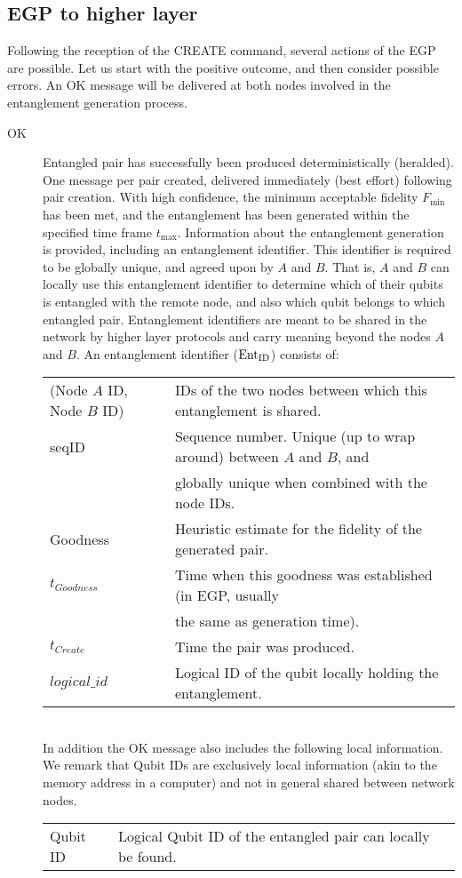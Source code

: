 \documentclass{article}
\newcommand{\entid}{{\rm Ent}_{\rm ID}}
\begin{document}
\subsection{EGP to higher layer}
Following the reception of the CREATE command, several actions of the EGP are possible. Let us start with the positive outcome, and then consider possible
errors. An OK message will be delivered at both nodes involved in the entanglement generation process.
\begin{description}
\item[OK] Entangled pair has successfully been produced deterministically (heralded). One message per pair created, delivered immediately (best effort) following pair creation. 
With high confidence, the minimum acceptable fidelity $F_{\min}$ has been met, and the entanglement has been generated
within the specified time frame $t_{\max}$. Information about the entanglement generation is provided, including an entanglement identifier. This identifier is required 
to be globally unique, and agreed upon by $A$ and $B$. That is, $A$ and $B$ can locally use this entanglement identifier to determine which of their qubits is entangled with the remote
node, and also which qubit belongs to which entangled pair. Entanglement identifiers are meant to be shared in the network by higher layer protocols and carry meaning beyond the nodes
$A$ and $B$. An entanglement identifier ($\entid$) consists of:\\
\noindent
\begin{tabular}{ll}
(Node $A$ ID, Node $B$ ID) & IDs of the two nodes between which this entanglement is shared.\\
seqID & Sequence number. Unique (up to wrap around) between $A$ and $B$, and \\
& globally unique when combined with the node IDs.\\
Goodness & Heuristic estimate for the fidelity of the generated pair.\\
$t_{Goodness}$ & Time when this goodness was established (in EGP, usually \\
& the same as generation time).\\
$t_{Create}$ & Time the pair was produced.\\
$logical\_id$ & Logical ID of the qubit locally holding the entanglement.
\end{tabular}\\

\smallskip
\noindent
In addition the OK message also includes the following local information. We remark that Qubit IDs are exclusively local information (akin to the memory address
in a computer) and not in general shared between network nodes.\\
\noindent
\begin{tabular}{ll}
Qubit ID & Logical Qubit ID of the entangled pair can locally be found.
\end{tabular}
\end{description}
\end{document}
